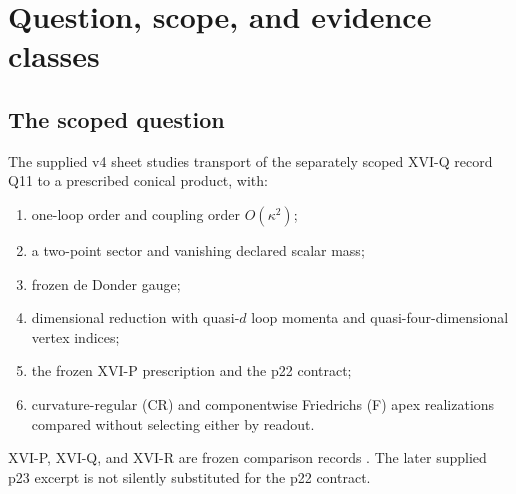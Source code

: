 \documentclass[11pt,a4paper]{article}
\newcommand{\ka}{\kappa}
\newcommand{\Span}{(\mathrm{Span})}
\newcommand{\NOTCLOSED}{\texttt{NOT\_CLOSED}}
\theoremstyle{plain}
\theoremstyle{definition}
\theoremstyle{remark}
\numberwithin{equation}{section}
\begin{document}
\begin{abstract}
\begin{enumerate}[label=\textup{(\arabic*)},leftmargin=1.6em]
\item \emph{Invariant structure of the \(hh\) poles.}
The constant-profile \(hh\) poles decompose into six
\(SO(1,1)\)-invariant structures.
In the complete \(hh\) sum the purely longitudinal structures
cancel, and the gauge variance enters only through
\(b_6+b_7=-\ka^2V/(4\pi)\).
The CR--F difference is gauge invariant:
\(-\nu\ka^2P^2f_0f_0'/(4\pi)\).
\end{enumerate}
A point-by-point table answers every issue v5 raised against v4.
An appendix lists full SHA-256 digests and rerun commands.

\smallskip\noindent\textbf{Still open.}
The 26 Ward combinations and the 34-dimensional projection;
the six exact values;
the D04 quadratic-profile part of the second \(\phi\phi\) value;
the evanescent coefficients;
the 18-dimensional engine map;
an exact \(\Span\) certificate;
and the vector-type keys.
None of these is reported as zero.
The scope remains one loop at \(O(\ka^2)\), the massless two-point
sector, frozen de Donder gauge, and the XVI-P prescription.
The cone and the CR branch remain inputs, and the
destructive-readout analogy supplies no premise.
\(\texttt{bulk\_symmetry\_restored}=\texttt{false}\), and
O.1 on the cone remains \(\NOTCLOSED\).
\end{abstract}


\tableofcontents

\section{Question, scope, and evidence classes}
\label{sec:introduction}

\subsection{The scoped question}

The supplied v4 sheet studies transport of the separately scoped
XVI-Q record Q11 to a prescribed conical product, with:
\begin{enumerate}[label=\textup{(\roman*)}]
\item one-loop order and coupling order \(O(\ka^2)\);
\item a two-point sector and vanishing declared scalar mass;
\item frozen de Donder gauge;
\item dimensional reduction with quasi-\(d\) loop momenta and
quasi-four-dimensional vertex indices;
\item the frozen XVI-P prescription and the p22 contract;
\item curvature-regular (CR) and componentwise Friedrichs (F)
apex realizations compared without selecting either by readout.
\end{enumerate}
XVI-P, XVI-Q, and XVI-R are frozen comparison records
\cite{CheungP,CheungQ,CheungR}.
The later supplied p23 excerpt is not silently substituted for the
p22 contract.
\end{document}

